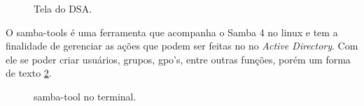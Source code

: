
\begin{figure}[h!]
   	\centering
   	\caption{Tela do DSA.}
    \label{tela_dsa}
\end{figure}

\pagebreak

O samba-tools é uma ferramenta que acompanha o Samba 4 no linux e tem a finalidade de gerenciar as ações que podem ser feitas no no \textit{Active Directory}. Com ele se poder criar usuários, grupos, gpo's, entre outras funções, porém um forma de texto \ref{samba-tool}.

\begin{figure}[h!]
   	\centering
   	\caption{samba-tool no terminal.}
    \label{samba-tool}
\end{figure}






